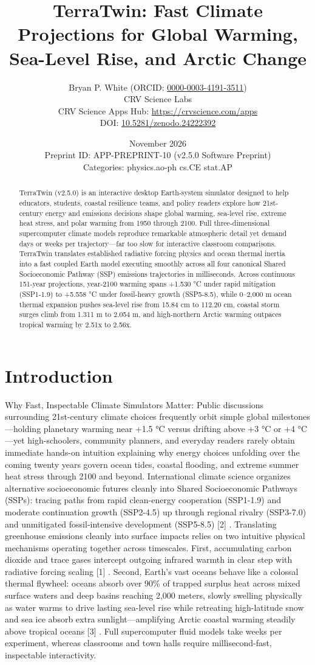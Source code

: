 \documentclass[10pt,letterpaper]{article}
\title{\textbf{TerraTwin: Fast Climate Projections for Global Warming, Sea-Level Rise, and Arctic Change}}
\author{Bryan P. White (ORCID: \href{https://orcid.org/0000-0003-4191-3511}{0000-0003-4191-3511}) \\ CRV Science Labs \\ \small CRV Science Apps Hub: \url{https://crvscience.com/apps} \\ \small DOI: \href{https://doi.org/10.5281/zenodo.24222392}{10.5281/zenodo.24222392}}
\date{November 2026 \\ \small Preprint ID: APP-PREPRINT-10 (v2.5.0 Software Preprint) \\ \small Categories: physics.ao-ph \textbullet{} cs.CE \textbullet{} stat.AP}
\begin{document}
\maketitle

\begin{abstract}
TerraTwin (v2.5.0) is an interactive desktop Earth-system simulator designed to help educators, students, coastal resilience teams, and policy readers explore how 21st-century energy and emissions decisions shape global warming, sea-level rise, extreme heat stress, and polar warming from 1950 through 2100. Full three-dimensional supercomputer climate models reproduce remarkable atmospheric detail yet demand days or weeks per trajectory---far too slow for interactive classroom comparisons. TerraTwin translates established radiative forcing physics and ocean thermal inertia into a fast coupled Earth model executing smoothly across all four canonical Shared Socioeconomic Pathway (SSP) emissions trajectories in milliseconds. Across continuous 151-year projections, year-2100 warming spans +1.530 °C under rapid mitigation (SSP1-1.9) to +5.558 °C under fossil-heavy growth (SSP5-8.5), while 0--2,000 m ocean thermal expansion pushes sea-level rise from 15.84 cm to 112.20 cm, coastal storm surges climb from 1.311 m to 2.054 m, and high-northern Arctic warming outpaces tropical warming by 2.51x to 2.56x.
\end{abstract}

\section{Introduction}
Why Fast, Inspectable Climate Simulators Matter: Public discussions surrounding 21st-century climate choices frequently orbit simple global milestones---holding planetary warming near +1.5 °C versus drifting above +3 °C or +4 °C---yet high-schoolers, community planners, and everyday readers rarely obtain immediate hands-on intuition explaining why energy choices unfolding over the coming twenty years govern ocean tides, coastal flooding, and extreme summer heat stress through 2100 and beyond. International climate science organizes alternative socioeconomic futures cleanly into Shared Socioeconomic Pathways (SSPs): tracing paths from rapid clean-energy cooperation (SSP1-1.9) and moderate continuation growth (SSP2-4.5) up through regional rivalry (SSP3-7.0) and unmitigated fossil-intensive development (SSP5-8.5) [2] . Translating greenhouse emissions cleanly into surface impacts relies on two intuitive physical mechanisms operating together across timescales. First, accumulating carbon dioxide and trace gases intercept outgoing infrared warmth in clear step with radiative forcing scaling [1] . Second, Earth's vast oceans behave like a colossal thermal flywheel: oceans absorb over 90\% of trapped surplus heat across mixed surface waters and deep basins reaching 2,000 meters, slowly swelling physically as water warms to drive lasting sea-level rise while retreating high-latitude snow and sea ice absorb extra sunlight---amplifying Arctic coastal warming steadily above tropical oceans [3] . Full supercomputer fluid models take weeks per experiment, whereas classrooms and town halls require millisecond-fast, inspectable interactivity.
\end{document}
